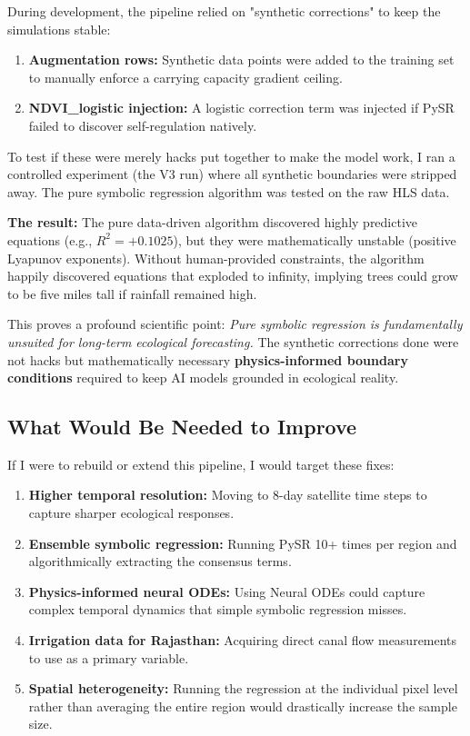\documentclass[12pt, a4paper]{article}
\begin{document}
During development, the pipeline relied on "synthetic corrections" to keep the simulations stable:
\begin{enumerate}[leftmargin=1.6em]
    \item \textbf{Augmentation rows:} Synthetic data points were added to the training set to manually enforce a carrying capacity gradient ceiling.
    \item \textbf{NDVI\_logistic injection:} A logistic correction term was injected if PySR failed to discover self-regulation natively.
\end{enumerate}

To test if these were merely hacks put together to make the model work, I ran a controlled experiment (the V3 run) where all synthetic boundaries were stripped away. The pure symbolic regression algorithm was tested on the raw HLS data.

\textbf{The result:} The pure data-driven algorithm discovered highly predictive equations (e.g., $R^2 = +0.1025$), but they were mathematically unstable (positive Lyapunov exponents). Without human-provided constraints, the algorithm happily discovered equations that exploded to infinity, implying trees could grow to be five miles tall if rainfall remained high.

This proves a profound scientific point: \emph{Pure symbolic regression is fundamentally unsuited for long-term ecological forecasting.} The synthetic corrections done were not hacks but mathematically necessary \textbf{physics-informed boundary conditions} required to keep AI models grounded in ecological reality.

\subsection{What Would Be Needed to Improve}

If I were to rebuild or extend this pipeline, I would target these fixes:
\begin{enumerate}[leftmargin=1.6em]
    \item \textbf{Higher temporal resolution:} Moving to 8-day satellite time steps to capture sharper ecological responses.
    \item \textbf{Ensemble symbolic regression:} Running PySR 10+ times per region and algorithmically extracting the consensus terms.
    \item \textbf{Physics-informed neural ODEs:} Using Neural ODEs \cite{chen2018} could capture complex temporal dynamics that simple symbolic regression misses.
    \item \textbf{Irrigation data for Rajasthan:} Acquiring direct canal flow measurements to use as a primary variable.
    \item \textbf{Spatial heterogeneity:} Running the regression at the individual pixel level rather than averaging the entire region would drastically increase the sample size.
\end{enumerate}
\end{document}
